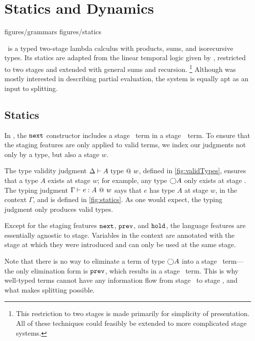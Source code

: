 
\section{\texorpdfstring{\lang}{λ12} Statics and Dynamics}
\label{sec:semantics}

 {figures/grammars}
 {figures/statics}

\lang\ is a typed two-stage lambda calculus with products, sums, and isorecursive types.
Its statics are adapted from the linear temporal logic given by \cite{davies96},
restricted to two stages and extended with general sums and recursion.%
\footnote{This restriction to two stages is made primarily for simplicity of
presentation. All of these techniques could feasibly be extended to more
complicated stage systems.} 
Although \cite{davies96} was mostly interested in describing partial evaluation,
the system is equally apt as an input to splitting.

\subsection{Statics}

In \lang, the ${\tt next}$ constructor includes a stage \bbtwo\ term in a
stage~\bbone\ term. To ensure that the staging features are only applied to
valid terms, we index our judgments not only by a type, but also a stage $w$.

The type validity judgment $\Delta \vdash A ~{\rm type}~@~w$, defined in
\cref{fig:validTypes}, ensures that a type $A$ exists at stage $w$; for
example, any type $\bigcirc A$ only exists at stage \bbone.  The typing judgment
$\Gamma{} \vdash {e}:{A}~@~w$ says that $e$ has type $A$ at stage $w$, in the context
$\Gamma$, and is defined in \cref{fig:statics}.  As one would expect, the
typing judgment only produces valid types.

Except for the staging features ${\tt next}$, ${\tt prev}$, and ${\tt hold}$, the language
features are essentially agnostic to stage. Variables in the context are
annotated with the stage at which they were introduced and can only be used at
the same stage.

Note that there is no way to eliminate a term of type $\bigcirc A$ into a stage
\bbone\ term---the only elimination form is ${\tt prev}$, which results in a stage
\bbtwo\ term. This is why well-typed terms cannot have any information flow
from stage \bbtwo\ to stage \bbone, and what makes splitting possible.

